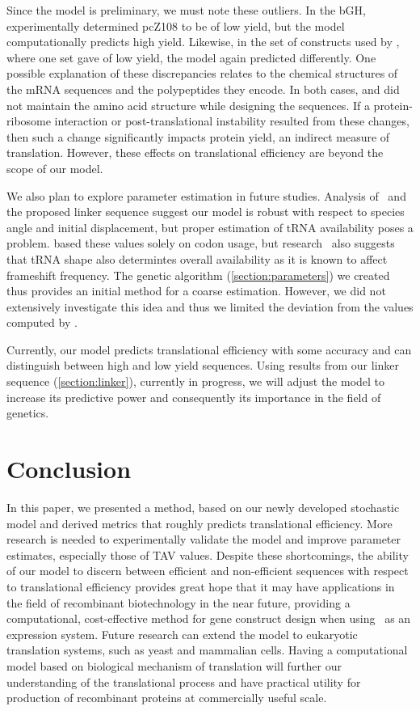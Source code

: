 \documentclass[12pt]{article}
\begin{document}
Since the model is preliminary, we must note these outliers.  In the
bGH, \citeauthor{schoner:bgh} experimentally determined pcZ108 to be
of low yield, but the model computationally predicts high yield.
Likewise, in the set of constructs used by \citet{weiss87}, where one
set gave of low yield, the model again predicted differently.  One
possible explanation of these discrepancies relates to the chemical
structures of the mRNA sequences and the polypeptides they
encode.  In both cases, \citeauthor{weiss87} and
\citeauthor{schoner:bgh} did not maintain the amino
acid structure while designing the sequences. If a protein-ribosome
interaction or post-translational instability resulted from these
changes, then such a change significantly impacts protein yield, an
indirect measure of translation. However, these effects on
translational efficiency are beyond the scope of our model.

We also plan to explore parameter estimation in future studies.
Analysis of \prfB\ and the
proposed linker sequence suggest our model is robust with respect to species angle
and initial displacement, but proper estimation of tRNA availability
poses a problem. \citet{lalit:mechanics} based these values solely on 
codon usage, but research~\cite{phelps} also suggests that tRNA shape
also determintes overall availability as it is known to affect
frameshift frequency. The
genetic algorithm (\autoref{section:parameters}) we created thus
provides an initial method for a coarse estimation. However, we did
not extensively investigate this idea and thus we limited the
deviation from the values computed by \citeauthor{lalit:mechanics}.

Currently, our model predicts translational efficiency with some
accuracy and can distinguish between high and low yield sequences. 
Using results from our linker sequence (\autoref{section:linker}), 
currently in progress, we will adjust the model to increase its 
predictive power and consequently its importance in the field of 
genetics.

\section{Conclusion}
\label{section:conclusion}

In this paper, we presented a method, based on our newly
developed stochastic model and derived metrics that roughly predicts
translational efficiency.  More research is needed to
experimentally validate the model and improve parameter
estimates, especially those of TAV values. Despite these
shortcomings, the ability of our model to discern between efficient
and non-efficient sequences with respect to translational efficiency
provides great hope that it may have applications in the field of
recombinant biotechnology in the near future, providing a
computational, cost-effective method for gene construct
design when using \ecoli\ as an expression system.  Future research
can extend the model to eukaryotic translation systems, such as yeast
and mammalian cells.  Having a computational model based on biological
mechanism of translation will further our understanding of the
translational process and have practical utility for production of
recombinant proteins at commercially useful scale.

{}
\begin{singlespace}  \end{singlespace}
\end{document}
